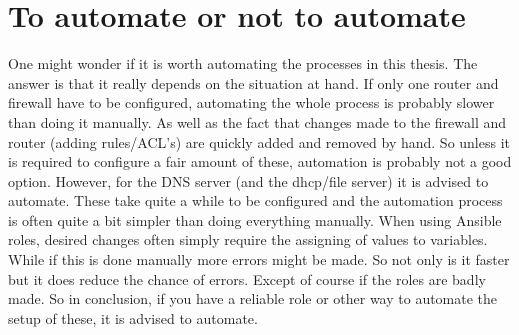 \section{To automate or not to automate}
One might wonder if it is worth automating the processes in this thesis. The answer is that it really depends on the situation at hand. If only one router and firewall have to be configured, automating the whole process is probably slower than doing it manually. As well as the fact that changes made to the firewall and router (adding rules/ACL's) are quickly added and removed by hand. So unless it is required to configure a fair amount of these, automation is probably not a good option. However, for the DNS server (and the dhcp/file server) it is advised to automate. These take quite a while to be configured and the automation process is often quite a bit simpler than doing everything manually. When using Ansible roles, desired changes often simply require the assigning of values to variables. While if this is done manually more errors might be made. So not only is it faster but it does reduce the chance of errors. Except of course if the roles are badly made. So in conclusion, if you have a reliable role or other way to automate the setup of these, it is advised to automate.
















